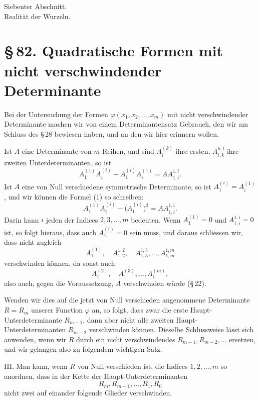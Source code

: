 \documentclass[11pt]{article}
\providecommand{\sect}[2]{\section*{\S\,#1. #2}}
\begin{document}
\begin{center}
{\large Siebenter Abschnitt.}\\[0.6em]
{\Large Realit\"at der Wurzeln.}
\end{center}

\sect{82}{Quadratische Formen mit nicht verschwindender Determinante}

Bei der Untersuchung der Formen $\varphi(x_1,x_2,\ldots,x_m)$ mit nicht verschwindender Determinante machen wir von einem Determinantensatz Gebrauch, den wir am Schluss des \S\,28 bewiesen haben, und an den wir hier erinnern wollen.

Ist $A$ eine Determinante von $m$ Reihen, und sind $A_i^{(k)}$ ihre ersten, $A_{i,k}^{h,l}$ ihre zweiten Unterdeterminanten, so ist
\begin{equation}
        A_1^{(1)}A_i^{(i)}-A_1^{(i)}A_i^{(1)}=A A_{1,i}^{1,i}.
\tag{1}
\end{equation}
Ist $A$ eine von Null verschiedene symmetrische Determinante, so ist $A_1^{(i)}=A_i^{(1)}$, und wir k\"onnen die Formel (1) so schreiben:
\begin{equation}
        A_1^{(1)}A_i^{(i)}-\bigl(A_1^{(i)}\bigr)^2=A A_{1,i}^{1,i}.
\tag{2}
\end{equation}
Darin kann $i$ jeden der Indices $2,3,\ldots,m$ bedeuten. Wenn $A_1^{(1)}=0$ und $A_{1,i}^{1,i}=0$ ist, so folgt hieraus, dass auch $A_1^{(i)}=0$ sein muss, und daraus schliessen wir, dass nicht zugleich
\[
        A_1^{(1)},\quad A_{1,2}^{1,2},\quad A_{1,3}^{1,3},\ldots, A_{1,m}^{1,m}
\]
verschwinden k\"onnen, da sonst auch
\[
        A_1^{(2)},\quad A_1^{(3)},\ldots,A_1^{(m)},
\]
also auch, gegen die Voraussetzung, $A$ verschwinden w\"urde (\S\,22).

Wenden wir dies auf die jetzt von Null verschieden angenommene Determinante $R=R_m$ unserer Function $\varphi$ an, so folgt, dass zwar die erste Haupt-Unterdeterminante $R_{m-1}$, dann aber nicht alle zweiten Haupt-Unterdeterminanten $R_{m-2}$ verschwinden k\"onnen. Dieselbe Schlussweise l\"asst sich anwenden, wenn wir $R$ durch ein nicht verschwindendes $R_{m-1},R_{m-2},\ldots$ ersetzen, und wir gelangen also zu folgendem wichtigen Satz:

III. Man kann, wenn $R$ von Null verschieden ist, die Indices $1,2,
\ldots,m$ so anordnen, dass in der Kette der Haupt-Unterdeterminanten
\begin{equation}
        R_m, R_{m-1},\ldots,R_1,R_0
\tag{3}
\end{equation}
nicht zwei auf einander folgende Glieder verschwinden.
\end{document}
